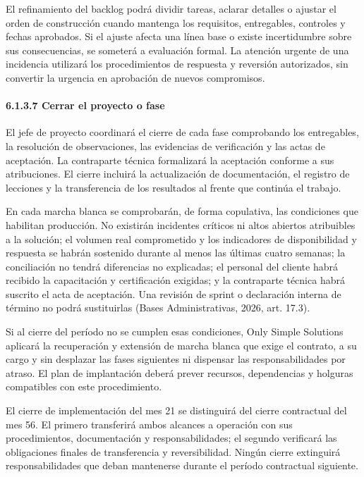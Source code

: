 \documentclass[11pt]{article}
\begin{document}
El refinamiento del backlog podrá dividir tareas, aclarar detalles o
ajustar el orden de construcción cuando mantenga los requisitos,
entregables, controles y fechas aprobados. Si el ajuste afecta una línea
base o existe incertidumbre sobre sus consecuencias, se someterá a
evaluación formal. La atención urgente de una incidencia utilizará los
procedimientos de respuesta y reversión autorizados, sin convertir la
urgencia en aprobación de nuevos compromisos.

\paragraph{6.1.3.7 Cerrar el proyecto o fase}\label{6-1-3-7-cerrar-el-proyecto-o-fase}

El jefe de proyecto coordinará el cierre de cada fase comprobando los entregables, la resolución de observaciones, las evidencias de verificación y las actas de aceptación. La contraparte técnica formalizará la aceptación conforme a sus atribuciones. El cierre incluirá la actualización de documentación, el registro de lecciones y la transferencia de los resultados al frente que continúa el trabajo.

En cada marcha blanca se comprobarán, de forma copulativa, las
condiciones que habilitan producción. No existirán incidentes críticos
ni altos abiertos atribuibles a la solución; el volumen real
comprometido y los indicadores de disponibilidad y respuesta se habrán
sostenido durante al menos las últimas cuatro semanas; la conciliación
no tendrá diferencias no explicadas; el personal del cliente habrá
recibido la capacitación y certificación exigidas; y la contraparte
técnica habrá suscrito el acta de aceptación. Una revisión de sprint o
declaración interna de término no podrá sustituirlas (Bases
Administrativas, 2026, art. 17.3).

Si al cierre del período no se cumplen esas condiciones, Only Simple
Solutions aplicará la recuperación y extensión de marcha blanca que
exige el contrato, a su cargo y sin desplazar las fases siguientes ni
dispensar las responsabilidades por atraso. El plan de implantación
deberá prever recursos, dependencias y holguras compatibles con este
procedimiento.

El cierre de implementación del mes 21 se distinguirá del cierre
contractual del mes 56. El primero transferirá ambos alcances a
operación con sus procedimientos, documentación y responsabilidades; el
segundo verificará las obligaciones finales de transferencia y
reversibilidad. Ningún cierre extinguirá responsabilidades que deban
mantenerse durante el período contractual siguiente.
\end{document}

